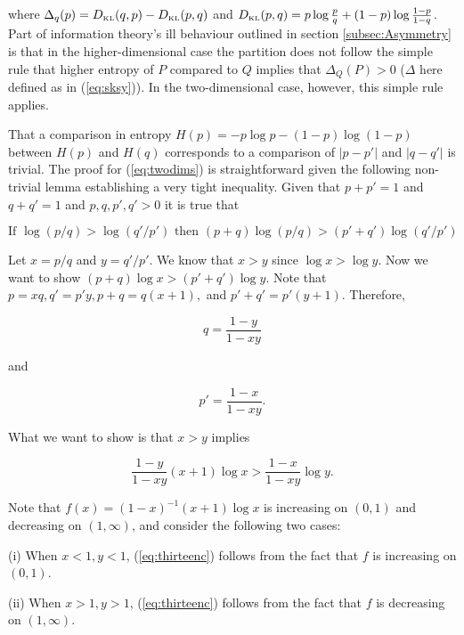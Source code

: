\documentclass[phd,12pt,oneside]{ubcthesis}
\begin{document}
{\noindent}where $\Delta_{q}(p)=D_{\mbox{\tiny KL}}(q,p)-D_{\mbox{\tiny
    KL}}(p,q)$ and $D_{\mbox{\tiny
    KL}}(p,q)=p\log\frac{p}{q}+(1-p)\log\frac{1-p}{1-q}$. Part of
information theory's ill behaviour outlined in section
\ref{subsec:Asymmetry} is that in the higher-dimensional case the
partition does not follow the simple rule that higher entropy of $P$
compared to $Q$ implies that $\Delta_{Q}(P)>0$ ($\Delta$ here defined
as in (\ref{eq:sksy})). In the two-dimensional case, however, this
simple rule applies. 

That a comparison in entropy $H(p)=-p\log{}p-(1-p)\log(1-p)$ between
$H(p)$ and $H(q)$ corresponds to a comparison of $|p-p'|$ and $|q-q'|$
is trivial. The proof for (\ref{eq:twodims}) is straightforward given
the following non-trivial lemma establishing a very tight inequality.
Given that $p+p'=1$ and $q+q'=1$ and $p,q,p',q'>0$ it is true
that

\begin{equation}
  \label{eq:lemma}
  \mbox{If }\log(p/q)>\log(q'/p')\mbox{ then }(p+q)\log(p/q)>(p'+q')\log(q'/p')
\end{equation}

{\noindent}Let $x=p/q$ and $y=q'/p'$. We know that $x>y$ since $\log{}x>\log{}y$.
Now we want to show $(p+q)\log{}x>(p'+q')\log{}y$. Note that
$p=xq,q'=p'y,p+q=q(x+1),$ and $p'+q'=p'(y+1)$. Therefore,

\begin{equation}
  \label{eq:thirteena}
  q=\frac{1-y}{1-xy}
\end{equation}

{\noindent}and

\begin{equation}
  \label{eq:thirteenb}
  p'=\frac{1-x}{1-xy}.
\end{equation}

{\noindent}What we want to show is that $x>y$ implies

\begin{equation}
  \label{eq:thirteenc}
  \frac{1-y}{1-xy}(x+1)\log{}x>\frac{1-x}{1-xy}\log{}y.
\end{equation}

{\noindent}Note that $f(x)=(1-x)^{-1}(x+1)\log{}x$ is increasing on $(0,1)$ and
decreasing on $(1,\infty{})$, and consider the following two cases:

(i) When $x<1,y<1$, (\ref{eq:thirteenc}) follows from the fact that
$f$ is increasing on $(0,1)$.

(ii) When $x>1,y>1$, (\ref{eq:thirteenc}) follows from the fact that
$f$ is decreasing on $(1,\infty)$.
\end{document}
